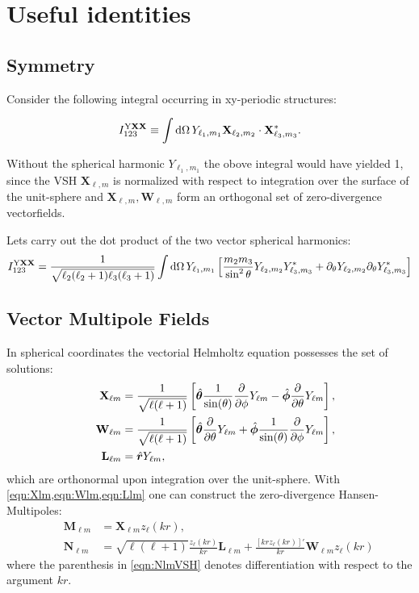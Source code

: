 \section{Useful identities}
\subsection{Symmetry}
Consider the following integral occurring in xy-periodic structures:

\begin{equation}
I^{\mathrm{Y\mathbf{X}\mathbf{X}}}_{123} \equiv \int \mathrm{d} \Omega \, Y_{\ell_1, m_1} \mathbf{X}_{\ell_2, m_2}\cdot \mathbf{X}^*_{\ell_3,m_3}.
\label{eqn:YXX_integral}
\end{equation}

Without the spherical harmonic $Y_{\ell_1,m_1}$ the obove integral would have yielded
1, since the VSH $\mathbf{X}_{\ell, m}$ is normalized with respect to integration over the surface of the unit-sphere and $\mathbf{X}_{\ell,m},\mathbf{W}_{\ell,m}$ form an orthogonal set of zero-divergence vectorfields. 

Lets carry out the dot product of the two vector spherical harmonics:
\begin{equation}
I^{\mathrm{Y\mathbf{X}\mathbf{X}}}_{123} =\frac{1}{\sqrt{\ell_2(\ell_2+1)\ell_3(\ell_3+1)}}\int \mathrm{d} \Omega\, 
Y_{\ell_1,m_1}\left[
\frac{m_2 m_3}{\sin^2\theta} Y_{\ell_2,m_2} Y^*_{\ell_3, m_3}
+\partial_\theta Y_{\ell_2,m_2}\partial_\theta Y^*_{\ell_3,m_3}
\right]
\label{eqn:YXX_integral_split}
\end{equation}
\subsection{Vector Multipole Fields}
In spherical coordinates the vectorial Helmholtz equation possesses the set of
solutions:
\begin{align}
&& \mathbf{X}_{\ell m} &= \frac{1}{\sqrt{\ell(\ell+1)}} \left[
\hat{\bm{\theta}} \frac{1}{\sin(\theta)} \frac{\partial}{\partial \phi} Y_{\ell m} -
\hat{\bm{\phi}} \frac{\partial}{\partial \theta} Y_{\ell m}
\right], \label{eqn:Xlm}\\
&& \mathbf{W}_{\ell m} &= \frac{1}{\sqrt{\ell(\ell+1)}} \left[
\hat{\bm{\theta}} \frac{\partial}{\partial \theta} Y_{\ell m} +
\hat{\bm{\phi}} \frac{1}{\sin(\theta)} \frac{\partial}{\partial \phi} Y_{\ell m} 
\right], \label{eqn:Wlm}\\
&& \mathbf{L}_{\ell m} &= \hat{\bm{r}} Y_{\ell m},\label{eqn:Llm}
\end{align}
which are orthonormal upon integration over the unit-sphere. With \cref{eqn:Xlm,eqn:Wlm,eqn:Llm} one can construct the zero-divergence Hansen-Multipoles:
\begin{align}
&& \mathbf{M}_{\ell m} &= \mathbf{X}_{\ell m} z_\ell(kr), \\
&& \mathbf{N}_{\ell m} &= \sqrt{\ell(\ell+1)} \frac{z_\ell(kr)}{kr} \mathbf{L}_{\ell m}+
\frac{\left[kr z_\ell(kr)\right]'}{kr}\mathbf{W}_{\ell m} z_\ell(kr) \label{eqn:NlmVSH}
\end{align}
where the parenthesis in \cref{eqn:NlmVSH} denotes differentiation with respect to the argument $kr$.


